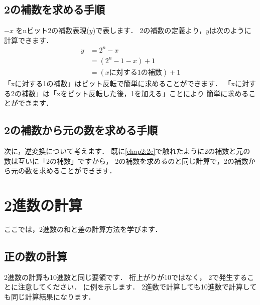 \subsection{2の補数を求める手順}

$-x$ をnビット2の補数表現($y$)で表します．
2の補数の定義より，$y$は次のように計算できます．
{\small\begin{align*}
y &= 2^n - x             \\
  &= (2^n - 1 - x) + 1   \\
  &= (xに対する1の補数 ) + 1
\end{align*}}
「xに対する1の補数」はビット反転で簡単に求めることができます．
「xに対する2の補数」は「xをビット反転した後，1を加える」ことにより
簡単に求めることができます．

\begin{center}
\end{center}

\subsection{2の補数から元の数を求める手順}
\label{hanten}

次に，逆変換について考えます．
既に\ref{chap2:2c}で触れたように2の補数と元の数は互いに「2の補数」ですから，
2の補数を求めるのと同じ計算で，2の補数から元の数を求めることができます．

\begin{center}
\end{center}

\section{2進数の計算}

ここでは，2進数の和と差の計算方法を学びます．

\subsection{正の数の計算}
2進数の計算も10進数と同じ要領です．
桁上がりが10ではなく，
2で発生することに注意してください．
に例を示します．
2進数で計算しても10進数で計算しても同じ計算結果になります．

